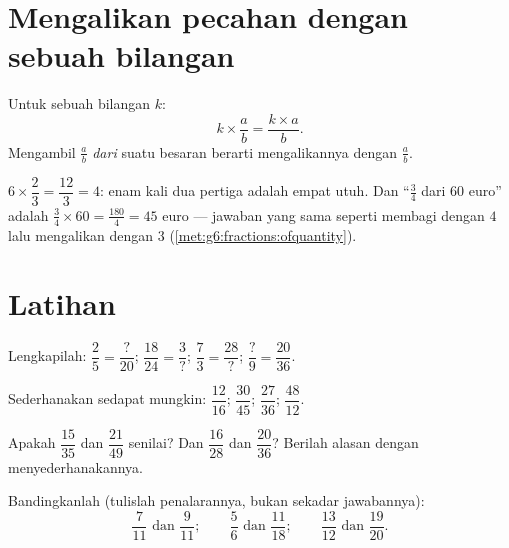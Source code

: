 \section{Mengalikan pecahan dengan sebuah bilangan}

\begin{proposition}\label{prop:g7:fractions:mult}
Untuk sebuah bilangan $k$:
\[
k \times \frac{a}{b} = \frac{k \times a}{b} .
\]
Mengambil $\frac ab$ \emph{dari} suatu besaran berarti mengalikannya
dengan $\frac ab$.
\end{proposition}
\admitted

\begin{example}\label{ex:g7:fractions:mult}
$6 \times \dfrac{2}{3} = \dfrac{12}{3} = 4$: enam kali dua pertiga
adalah empat utuh. Dan ``$\frac34$ dari $60$ euro'' adalah
$\frac34 \times 60 = \frac{180}{4} = 45$ euro --- jawaban yang sama
seperti membagi dengan $4$ lalu mengalikan dengan $3$
(\cref{met:g6:fractions:ofquantity}).
\end{example}

\section{Latihan}

\begin{exercise}[$\star$]\label{exo:g7:fractions:1}
Lengkapilah: $\dfrac{2}{5} = \dfrac{?}{20}$; \quad
$\dfrac{18}{24} = \dfrac{3}{?}$; \quad
$\dfrac{7}{3} = \dfrac{28}{?}$; \quad
$\dfrac{?}{9} = \dfrac{20}{36}$.
\end{exercise}

\begin{exercise}[$\star$]\label{exo:g7:fractions:2}
Sederhanakan sedapat mungkin:
$\dfrac{12}{16}$; \quad $\dfrac{30}{45}$; \quad $\dfrac{27}{36}$;
\quad $\dfrac{48}{12}$.
\end{exercise}

\begin{exercise}[$\star$]\label{exo:g7:fractions:3}
Apakah $\dfrac{15}{35}$ dan $\dfrac{21}{49}$ senilai? Dan
$\dfrac{16}{28}$ dan $\dfrac{20}{36}$? Berilah alasan dengan menyederhanakannya.
\end{exercise}

\begin{exercise}[$\star$]\label{exo:g7:fractions:4}
Bandingkanlah (tulislah penalarannya, bukan sekadar jawabannya):
\[
\frac{7}{11} \text{ dan } \frac{9}{11}; \qquad
\frac{5}{6} \text{ dan } \frac{11}{18}; \qquad
\frac{13}{12} \text{ dan } \frac{19}{20}.
\]
\end{exercise}

